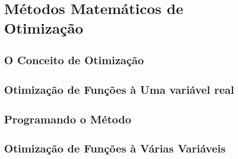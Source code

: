

\chapter{\Large{Métodos Matemáticos de Otimização}}\label{chp:1}


\section{{O Conceito de Otimização}}

\hspace{0.8cm} 

\section{{Otimização de Funções à Uma variável real}}

\hspace{0.8cm} 

\section{{Programando o Método}}

\hspace{0.8cm} 

\textcolor[rgb]{1,0,0}{\section{{Otimização de Funções à Várias Variáveis}}}

\hspace{0.8cm} 





